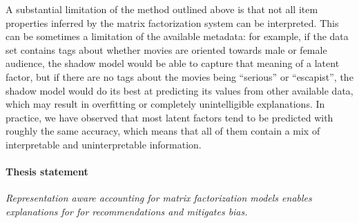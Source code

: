 A substantial limitation of the method outlined above is that not all
item properties inferred by the matrix factorization system can be interpreted.
This can be sometimes a limitation of the available metadata: for example,
if the data set contains tags about whether movies are oriented towards male or
female audience, the shadow model would be able to capture that meaning of a
latent factor, but if there are no tags about the movies being ``serious'' or
``escapist'', the shadow model would do its best at predicting its values from
other available data, which may result in overfitting or completely
unintelligible explanations. In practice, we have observed that most latent
factors tend to be predicted with roughly the same accuracy, which means that
all of them contain a mix of interpretable and uninterpretable information.




\paragraph{Thesis statement}

\emph{Representation aware accounting for matrix factorization models enables
explanations for for recommendations and mitigates bias.}

